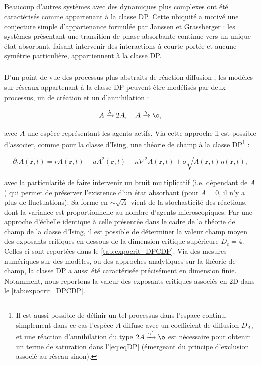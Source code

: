 \subparagraph{}Beaucoup d'autres systèmes avec des dynamiques plus complexes ont été caractérisés comme appartenant à la classe DP. Cette ubiquité a motivé une conjecture simple d'appartenance formulée par Janssen et Grassberger \cite{janssen_nonequilibrium_1981, grassberger_phase_1982} : les systèmes présentant une transition de phase absorbante continue vers un unique état absorbant, faisant intervenir des interactions à courte portée et aucune symétrie particulière, appartiennent à la classe DP.

\subparagraph{}D'un point de vue des processus plus abstraits de réaction-diffusion \cite{tauber_applications_2005}, les modèles sur réseaux appartenant à la classe DP peuvent être modélisés par deux processus, un de création et un d’annihilation :

\begin{equation}
A \xrightarrow[]{\lambda} 2A, \quad A \xrightarrow[]{\gamma} \o,
\label{eq:ReacDiffDP}
\end{equation}

\noindent avec $A$ une espèce représentant les agents actifs. Via cette approche il est possible d'associer, comme pour la classe d'Ising, une théorie de champ à la classe DP\footnote{Il est aussi possible de définir un tel processus dans l'espace continu, simplement dans ce cas l'espèce $A$ diffuse avec un coefficient de diffusion $D_A$, et une réaction d'annihilation du type $2A \xrightarrow[]{\gamma^\prime} \o$ est nécessaire pour obtenir un terme de saturation dans l'\autoref{eq:eqDP} (émergeant du principe d'exclusion associé au réseau sinon).} :

\begin{equation}
	\partial_t A(\mathbf{r}, t) = rA(\mathbf{r}, t) - uA^2(\mathbf{r}, t) + \kappa\nabla^2 A (\mathbf{r}, t) + \sigma \sqrt{A(\mathbf{r}, t)} \eta(\mathbf{r}, t),
	\label{eq:eqDP}
\end{equation}

\noindent avec la particularité de faire intervenir un bruit multiplicatif (i.e. dépendant de $A$) qui permet de préserver l'existence d'un état absorbant (pour $A=0$, il n'y a plus de fluctuations). Sa forme en $\sim \sqrt{A}$ vient de la stochasticité des réactions, dont la variance est proportionnelle au nombre d'agents microscopiques.  Par une approche d'échelle identique à celle présentée dans le cadre de la théorie de champ de la classe d'Ising, il est possible de déterminer la valeur champ moyen des exposants critiques en-dessous de la dimension critique supérieure $D_c = 4$. Celles-ci sont reportées dans le \autoref{tab:expocrit_DPCDP}. Via des mesures numériques sur des modèles, ou des approches analytiques sur la théorie de champ, la classe DP a aussi été caractérisée précisément en dimension finie. Notamment, nous reportons la valeur des exposants critiques associés en 2D dans le \autoref{tab:expocrit_DPCDP}.

